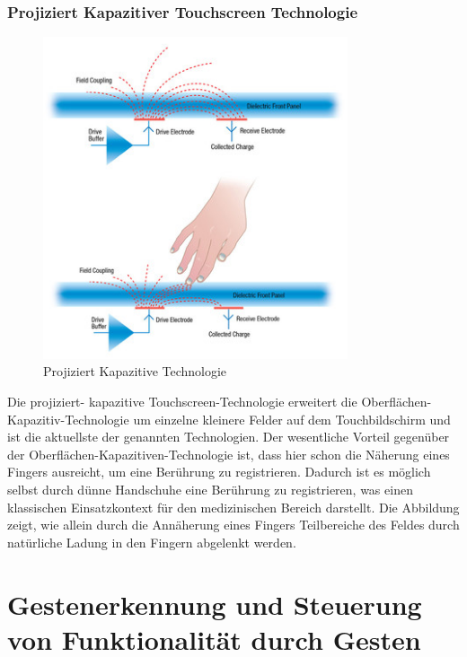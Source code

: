 \documentclass[12pt,oneside,a4paper,bibtotoc,liststotoc]{scrreprt}
\begin{document}
\subsection{Projiziert Kapazitiver Touchscreen Technologie}
\begin{figure}[H]
  \begin{centering}
    \includegraphics[width=0.8\textwidth]{img/projiziert_kapazitiv.png}
    \caption{Projiziert Kapazitive Technologie \cite[vgl. Projected-Capacitive]{002}}
    \label{projiziert_kapazitiv}
  \end{centering}
\end{figure}
Die projiziert- kapazitive Touchscreen-Technologie erweitert die Oberflächen-Kapazitiv-Technologie um einzelne kleinere Felder auf dem Touchbildschirm und ist die aktuellste der genannten Technologien. Der wesentliche Vorteil gegenüber der Oberflächen-Kapazitiven-Technologie ist, dass hier schon die Näherung eines Fingers ausreicht, um eine Berührung zu registrieren. Dadurch ist es möglich selbst durch dünne Handschuhe eine Berührung zu registrieren, was einen klassischen Einsatzkontext für den medizinischen Bereich darstellt. Die Abbildung zeigt, wie allein durch die Annäherung eines Fingers Teilbereiche des Feldes durch natürliche Ladung in den Fingern abgelenkt werden.

\chapter{Gestenerkennung und Steuerung von Funktionalität durch Gesten}
\end{document}
